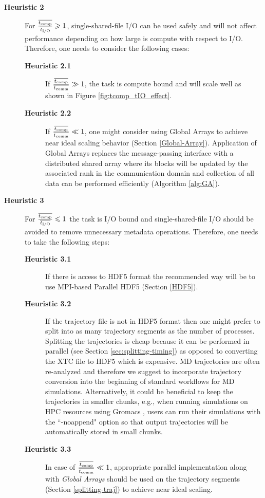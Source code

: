 \begin{description}
\item[\textbf{Heuristic 2}] For $\frac{\overline{{t}_{\text{comp}}}}{\overline{{t}_{\text{I/O}}}} \geqslant 1$, single-shared-file I/O can be used safely and will not affect performance depending on how large is compute with respect to I/O. Therefore, one needs to consider the following cases: 
  \begin{description}
  \item[\textbf{Heuristic 2.1}] If $\frac{\overline{{t}_{\text{comp}}}}{\overline{t_{\text{comm}}}} \gg 1$, the task is compute bound and will scale well as shown in Figure \ref{fig:tcomp_tIO_effect}. 
  \item[\textbf{Heuristic 2.2}] If $\frac{\overline{{t}_{\text{comp}}}}{\overline{t_{\text{comm}}}} \ll 1$, one might consider using Global Arrays to achieve near ideal scaling behavior (Section \ref{Global-Array}).  Application of Global Arrays replaces the message-passing interface with a distributed shared array where its blocks will be updated by the associated rank in the communication domain and collection of all data can be performed efficiently (Algorithm \ref{alg:GA}).
  \end{description}
\item[\textbf{Heuristic 3}] For $\frac{\overline{{t}_{\text{comp}}}}{\overline{{t}_{\text{I/O}}}} \leqslant 1$ the task is I/O bound and single-shared-file I/O should be avoided to remove unnecessary metadata operations. Therefore, one needs to take the following steps:  
  \begin{description}
    \item[\textbf{Heuristic 3.1}] If there is access to HDF5 format the recommended way will be to use MPI-based Parallel HDF5 (Section \ref{HDF5}). 
    \item[\textbf{Heuristic 3.2}] If the trajectory file is not in HDF5 format then one might prefer to split into as many trajectory segments as the number of processes. Splitting the trajectories is cheap because it can be performed in parallel (see Section \ref{sec:splitting-timing}) as opposed to converting the XTC file to HDF5 which is expensive. MD trajectories are often re-analyzed and therefore we suggest to incorporate trajectory conversion into the beginning of standard workflows for MD simulations. Alternatively, it could be beneficial to keep the trajectories in smaller chunks, e.g., when running simulations on HPC resources using Gromacs \cite{Gromacs3, Gromacs1}, users can run their simulations with the ``-noappend" option so that output trajectories will be automatically stored in small chunks.
    \item[\textbf{Heuristic 3.3}] In case of $\frac{\overline{{t}_{\text{comp}}}}{\overline{t_{\text{comm}}}} \ll 1$, appropriate parallel implementation along with \emph{Global Arrays} should be used on the trajectory segments (Section \ref{splitting-traj}) to achieve near ideal scaling.
  \end{description}
\end{description}
